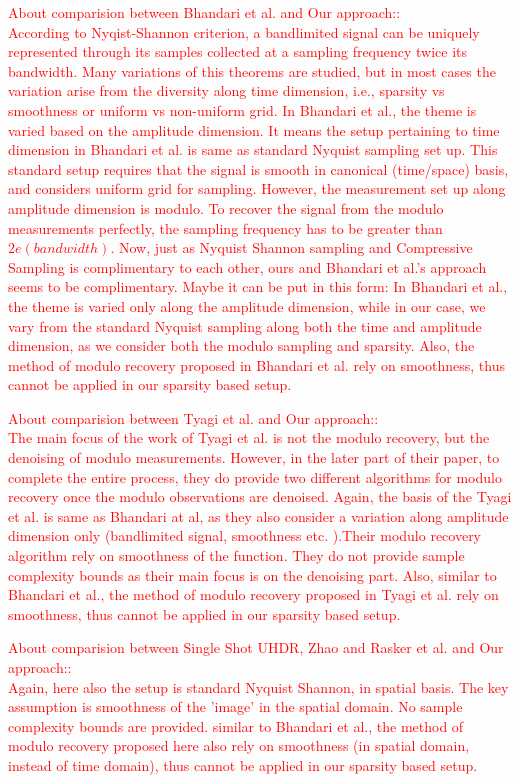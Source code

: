 \textcolor{red}{ About comparision between Bhandari et al. and Our approach:: \\
According to Nyqist-Shannon criterion, a bandlimited signal can be uniquely represented through its samples collected at a sampling frequency twice its bandwidth. Many variations of this theorems are studied, but in most cases the variation arise from the diversity along time dimension, i.e., sparsity vs smoothness or uniform vs non-uniform grid. In Bhandari et al., the theme is varied based on the amplitude dimension. It means the setup pertaining to time dimension in Bhandari et al. is same as standard Nyquist sampling set up. This standard setup requires that the signal is smooth in canonical (time/space) basis, and considers uniform grid for sampling. However, the measurement set up along amplitude dimension is modulo. To recover the signal from the modulo measurements perfectly, the sampling frequency has to be greater than $2e(bandwidth)$.}
\textcolor{red}{
Now, just as Nyquist Shannon sampling and Compressive Sampling is complimentary to each other, ours and Bhandari et al.'s approach seems to be complimentary. Maybe it can be put in this form: In Bhandari et al., the theme is varied only along the amplitude dimension, while in our case, we vary from the standard Nyquist sampling along both the time and amplitude dimension, as we consider both the modulo sampling and sparsity. Also, the method of modulo recovery proposed in Bhandari et al. rely on smoothness, thus cannot be applied in our sparsity based setup.
}

\textcolor{red}{ About comparision between Tyagi et al. and Our approach:: \\
The main focus of the work of Tyagi et al. is not the modulo recovery, but the denoising of modulo measurements. However, in the later part of their paper, to complete the entire process, they do provide two different algorithms for modulo recovery once the modulo observations are denoised. Again, the basis of the Tyagi et al. is same as Bhandari at al,  as they also consider a variation along amplitude dimension only (bandlimited signal, smoothness etc. ).Their modulo recovery algorithm rely on smoothness of the function. They do not provide sample complexity bounds as their main focus is on the denoising part. Also, similar to Bhandari et al., the method of modulo recovery proposed in Tyagi et al. rely on smoothness, thus cannot be applied in our sparsity based setup.}

\textcolor{red}{About comparision between Single Shot UHDR, Zhao and Rasker et al.  and Our approach::\\
	Again, here also the setup is standard Nyquist Shannon, in spatial basis. The key assumption is smoothness of the 'image' in the spatial domain. No sample complexity bounds are provided. similar to Bhandari et al., the method of modulo recovery proposed here also rely on smoothness (in spatial domain, instead of time domain), thus cannot be applied in our sparsity based setup.}


